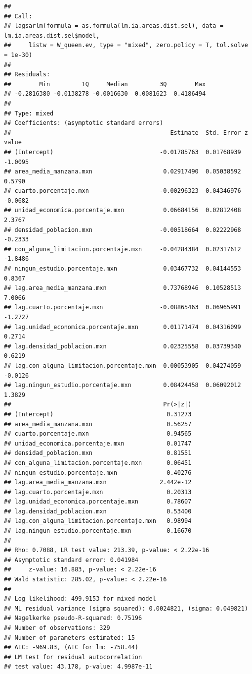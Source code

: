\documentclass[12pt,]{book}
\begin{document}
\begin{verbatim}
## 
## Call:
## lagsarlm(formula = as.formula(lm.ia.areas.dist.sel), data = lm.ia.areas.dist.sel$model, 
##     listw = W_queen.ev, type = "mixed", zero.policy = T, tol.solve = 1e-30)
## 
## Residuals:
##        Min         1Q     Median         3Q        Max 
## -0.2816380 -0.0138278 -0.0016630  0.0081623  0.4186494 
## 
## Type: mixed 
## Coefficients: (asymptotic standard errors) 
##                                             Estimate  Std. Error z value
## (Intercept)                              -0.01785763  0.01768939 -1.0095
## area_media_manzana.mxn                    0.02917490  0.05038592  0.5790
## cuarto.porcentaje.mxn                    -0.00296323  0.04346976 -0.0682
## unidad_economica.porcentaje.mxn           0.06684156  0.02812408  2.3767
## densidad_poblacion.mxn                   -0.00518664  0.02222968 -0.2333
## con_alguna_limitacion.porcentaje.mxn     -0.04284384  0.02317612 -1.8486
## ningun_estudio.porcentaje.mxn             0.03467732  0.04144553  0.8367
## lag.area_media_manzana.mxn                0.73768946  0.10528513  7.0066
## lag.cuarto.porcentaje.mxn                -0.08865463  0.06965991 -1.2727
## lag.unidad_economica.porcentaje.mxn       0.01171474  0.04316099  0.2714
## lag.densidad_poblacion.mxn                0.02325558  0.03739340  0.6219
## lag.con_alguna_limitacion.porcentaje.mxn -0.00053905  0.04274059 -0.0126
## lag.ningun_estudio.porcentaje.mxn         0.08424458  0.06092012  1.3829
##                                           Pr(>|z|)
## (Intercept)                                0.31273
## area_media_manzana.mxn                     0.56257
## cuarto.porcentaje.mxn                      0.94565
## unidad_economica.porcentaje.mxn            0.01747
## densidad_poblacion.mxn                     0.81551
## con_alguna_limitacion.porcentaje.mxn       0.06451
## ningun_estudio.porcentaje.mxn              0.40276
## lag.area_media_manzana.mxn               2.442e-12
## lag.cuarto.porcentaje.mxn                  0.20313
## lag.unidad_economica.porcentaje.mxn        0.78607
## lag.densidad_poblacion.mxn                 0.53400
## lag.con_alguna_limitacion.porcentaje.mxn   0.98994
## lag.ningun_estudio.porcentaje.mxn          0.16670
## 
## Rho: 0.7088, LR test value: 213.39, p-value: < 2.22e-16
## Asymptotic standard error: 0.041984
##     z-value: 16.883, p-value: < 2.22e-16
## Wald statistic: 285.02, p-value: < 2.22e-16
## 
## Log likelihood: 499.9153 for mixed model
## ML residual variance (sigma squared): 0.0024821, (sigma: 0.049821)
## Nagelkerke pseudo-R-squared: 0.75196 
## Number of observations: 329 
## Number of parameters estimated: 15 
## AIC: -969.83, (AIC for lm: -758.44)
## LM test for residual autocorrelation
## test value: 43.178, p-value: 4.9987e-11
\end{verbatim}
\end{document}
